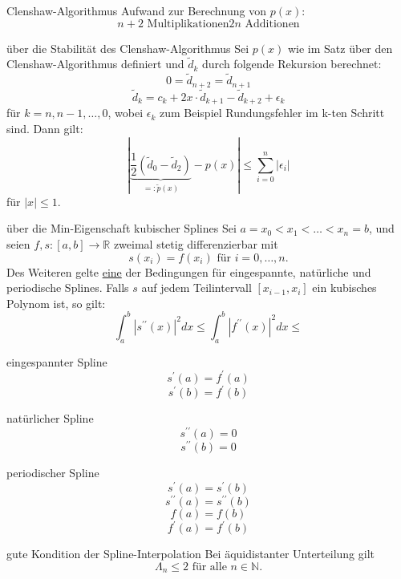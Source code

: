 \begin{flashcard}[Aufwand]{Clenshaw-Algorithmus}
Aufwand zur Berechnung von $p(x)$:
$$
	n+2 \text{ Multiplikationen}
	2n \text{ Additionen}
$$
\end{flashcard}

\begin{flashcard}[Satz]{über die Stabilität des Clenshaw-Algorithmus}
Sei $p(x)$ wie im Satz über den Clenshaw-Algorithmus definiert und $\tilde{d}_k$ durch folgende Rekursion berechnet:
$$
	0 = \tilde{d}_{n+2} = \tilde{d}_{n+1}
$$
$$
	\tilde{d}_k = c_k + 2x \cdot \tilde{d}_{k+1} - \tilde{d}_{k+2} + \epsilon_k
$$
für $k = n,n-1, \ldots , 0$, wobei $\epsilon_k$ zum Beispiel Rundungsfehler im k-ten Schritt sind. Dann gilt:
$$
	| \underbrace{\frac{1}{2}(\tilde{d}_0 - \tilde{d}_2)}_{=:\tilde{p}(x)} - p(x) | \leq \sum_{i=0}^n |\epsilon_i|
$$
für $|x| \leq 1$.
\end{flashcard}

\begin{flashcard}[Satz]{über die Min-Eigenschaft kubischer Splines}
Sei $a = x_0 < x_1 < \ldots < x_n = b$, und seien $f,s: [a,b] \rightarrow \mathbb{R}$ zweimal stetig differenzierbar mit
$$
	s(x_i) = f(x_i) \text{ für } i= 0, \ldots , n.
$$
Des Weiteren gelte \underline{eine} der Bedingungen für eingespannte, natürliche und periodische Splines.
Falls $s$ auf jedem Teilintervall $[x_{i-1}, x_i]$ ein kubisches Polynom ist, so gilt:
$$
	\int_a^b | s^{\prime\prime}(x) |^2dx \leq 	\int_a^b | f^{\prime\prime}(x) |^2dx \leq
$$
\end{flashcard}

\begin{flashcard}[Definition]{eingespannter Spline}
$$
	s^\prime(a) = f^\prime(a)
$$
$$
	s^\prime(b) = f^\prime(b)
$$
\end{flashcard}

\begin{flashcard}[Definition]{natürlicher Spline}
$$
	s^{\prime\prime}(a) = 0
$$
$$
	s^{\prime\prime}(b) = 0
$$
\end{flashcard}

\begin{flashcard}[Definition]{periodischer Spline}
$$
	s^{\prime}(a) = s^{\prime}(b)
$$
$$
	s^{\prime\prime}(a) = s^{\prime\prime}(b)
$$
$$
	f(a) = f(b)
$$
$$
	f^{\prime}(a) = f^{\prime}(b)
$$
\end{flashcard}

\begin{flashcard}[Satz]{gute Kondition der Spline-Interpolation}
Bei äquidistanter Unterteilung gilt
$$
	\Lambda_n \leq 2 \text{ für alle } n \in \mathbb{N}.
$$
\end{flashcard}

